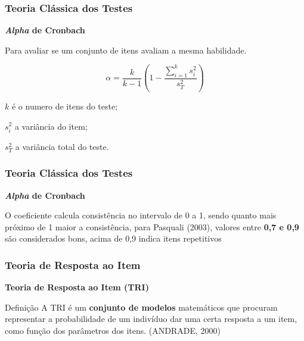 \documentclass{beamer}
\begin{document}
	
	\begin{frame}
		
		\frametitle{Teoria Clássica dos Testes}
		\begin{center}
			\textbf{\textit{Alpha} de Cronbach}
		\end{center}
		Para avaliar se um conjunto de itens avaliam a mesma habilidade.
		
		
		\[
		\alpha = \frac{k}{k-1}(1 - \frac{\sum_{i=1}^{k}{s^2_i}}{s_T^2})
		\]
		
		
		$k$ é o numero de itens do teste;
		
		${s_i^2}$ a variância do item;
		
		${s_T^2}$ a variância total do teste.
		
		
	\end{frame}
	
		
	\begin{frame}
		
		\frametitle{Teoria Clássica dos Testes}
		
		\begin{center}
			\textbf{\textit{Alpha} de Cronbach}
		\end{center}
		
		
		
		O coeficiente calcula consistência no intervalo de 0 a 1, sendo quanto mais próximo de 1 maior a consistência, para Pasquali (2003), valores entre \textbf{0,7 e 0,9} são considerados bons, acima de 0,9	 indica itens repetitivos
		
	\end{frame}
	
	
	\begin{frame}
		
		\frametitle{Teoria de Resposta ao Item}
		
		\begin{center}
			\textbf{Teoria de Resposta ao Item (TRI)}
		\end{center}
		
		\begin{block}{Definição}
			A TRI é um \textbf{conjunto de modelos} matemáticos que procuram representar a probabilidade de um indivíduo dar uma certa resposta a um item, como função dos parâmetros dos itens.
			(ANDRADE, 2000)
		\end{block}
		
	\end{frame}
	
\end{document}
